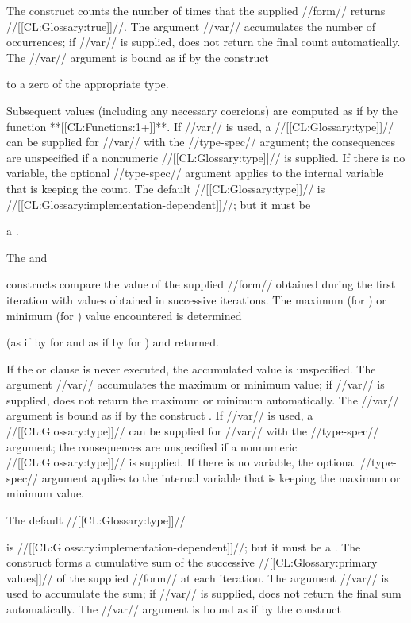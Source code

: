 The  construct counts the number of times  that the supplied //form// returns //[[CL:Glossary:true]]//. The argument //var// accumulates the number of occurrences;  if //var// is supplied,   does not return the final count automatically. The //var// argument is bound as if by the construct  

to a zero of the appropriate type.

Subsequent values (including any necessary coercions)  are computed as if by the function **[[CL:Functions:1+]]**. If  //var// is used, a //[[CL:Glossary:type]]// can be supplied  for //var// with the //type-spec// argument; the consequences are unspecified if a nonnumeric //[[CL:Glossary:type]]// is supplied.            If there is no  variable, the optional //type-spec// argument applies to the internal variable that is keeping the count.   The default //[[CL:Glossary:type]]// is //[[CL:Glossary:implementation-dependent]]//;  but it must be

a .
 

The  and 

  constructs compare the value of the supplied //form// obtained during the first  iteration with values obtained in successive iterations. The maximum (for ) or minimum (for )  value encountered is determined 

(as if by  for  and
 as if by  for ) and returned.

If the  or  clause is never executed, the accumulated value is unspecified. The argument //var// accumulates the maximum or minimum value; if //var// is supplied,  does not return the maximum or minimum automatically. The //var// argument is bound as if by the construct . If  //var// is used, a //[[CL:Glossary:type]]// can be supplied for //var// with the //type-spec// argument; the consequences are unspecified if a nonnumeric //[[CL:Glossary:type]]// is supplied.            If there is no  variable, the optional //type-spec// argument applies to the internal variable  that is keeping the maximum or minimum value.  

The default //[[CL:Glossary:type]]// 

is //[[CL:Glossary:implementation-dependent]]//; but it must be a .
  The  construct forms a cumulative sum  of the successive //[[CL:Glossary:primary values]]// of the supplied //form// at each iteration. The argument //var// is used to accumulate the sum; if //var// is supplied,  does not return the final sum automatically. The //var// argument is bound as if by the construct 

